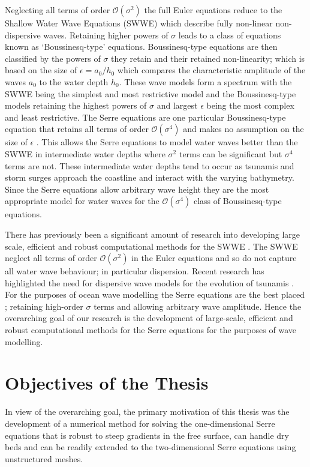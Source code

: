 Neglecting all terms of order $\mathcal{O}\left(\sigma ^2\right)$ the full Euler equations reduce to the Shallow Water Wave Equations (SWWE) \cite{Bonneton-Lannes-2009-16601} which describe fully non-linear non-dispersive waves. Retaining higher powers of $\sigma$ leads to a class of equations known as `Boussinesq-type' equations. Boussinesq-type equations are then classified by the powers of $\sigma$ they retain and their retained non-linearity; which is based on the size of $\epsilon= a_0 / h_0$ which compares the characteristic amplitude of the waves $a_0$ to the water depth $h_0$. These wave models form a spectrum with the SWWE being the simplest and most restrictive model and the Boussinesq-type models retaining the highest powers of $\sigma$ and largest $\epsilon$ being the most complex and least restrictive. The Serre equations are one particular Boussinesq-type equation that retains all terms of order $\mathcal{O}\left(\sigma ^4\right)$ and makes no assumption on the size of $\epsilon$ \cite{Bonneton-Lannes-2009-16601}. This allows the Serre equations to model water waves better than the SWWE in intermediate water depths where $\sigma^2$ terms can be significant but $\sigma^4$ terms are not. These intermediate water depths tend to occur as tsunamis and storm surges approach the coastline and interact with the varying bathymetry. Since the Serre equations allow arbitrary wave height they are the most appropriate model for water waves for the $\mathcal{O}\left(\sigma ^4\right)$ class of Boussinesq-type equations. 

There has previously been a significant amount of research into developing large scale, efficient and robust computational methods for the SWWE \cite{ClawPack,Comcot,ANUGA}. The SWWE neglect all terms of order $\mathcal{O}\left(\sigma ^2\right)$ in the Euler equations and so do not capture all water wave behaviour; in particular dispersion. Recent research has highlighted the need for dispersive wave models for the evolution of tsunamis \cite{Grue-etal-2008-113,Kirby-etal-2013-39}. For the purposes of ocean wave modelling the Serre equations are the best placed \cite{Bonneton-Lannes-2009-16601}; retaining high-order $\sigma$ terms and allowing arbitrary wave amplitude. Hence the overarching goal of our research is the development of large-scale, efficient and robust computational methods for the Serre equations for the purposes of wave modelling.

\section{Objectives of the Thesis}
In view of the overarching goal, the primary motivation of this thesis was the development of a numerical method for solving the one-dimensional Serre equations that is robust to steep gradients in the free surface, can handle dry beds and can be readily extended to the two-dimensional Serre equations using unstructured meshes. 

